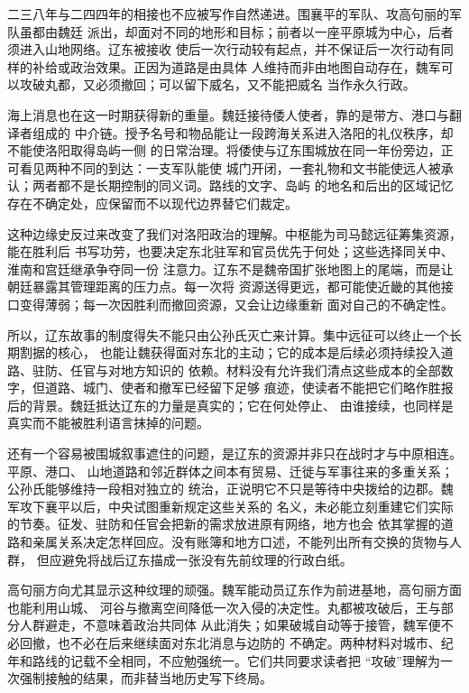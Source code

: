 二三八年与二四四年的相接也不应被写作自然递进。围襄平的军队、攻高句丽的军队虽都由魏廷
派出，却面对不同的地形和目标；前者以一座平原城为中心，后者须进入山地网络。辽东被接收
使后一次行动较有起点，并不保证后一次行动有同样的补给或政治效果。正因为道路是由具体
人维持而非由地图自动存在，魏军可以攻破丸都，又必须撤回；可以留下威名，又不能把威名
当作永久行政。

海上消息也在这一时期获得新的重量。魏廷接待倭人使者，靠的是带方、港口与翻译者组成的
中介链。授予名号和物品能让一段跨海关系进入洛阳的礼仪秩序，却不能使洛阳取得岛屿一侧
的日常治理。将倭使与辽东围城放在同一年份旁边，正可看见两种不同的到达：一支军队能使
城门开闭，一套礼物和文书能使远人被承认；两者都不是长期控制的同义词。路线的文字、岛屿
的地名和后出的区域记忆存在不确定处，应保留而不以现代边界替它们裁定。

这种边缘史反过来改变了我们对洛阳政治的理解。中枢能为司马懿远征筹集资源，能在胜利后
书写功劳，也要决定东北驻军和官员优先于何处；这些选择同关中、淮南和宫廷继承争夺同一份
注意力。辽东不是魏帝国扩张地图上的尾端，而是让朝廷暴露其管理距离的压力点。每一次将
资源送得更远，都可能使近畿的其他接口变得薄弱；每一次因胜利而撤回资源，又会让边缘重新
面对自己的不确定性。

所以，辽东故事的制度得失不能只由公孙氏灭亡来计算。集中远征可以终止一个长期割据的核心，
也能让魏获得面对东北的主动；它的成本是后续必须持续投入道路、驻防、任官与对地方知识的
依赖。材料没有允许我们清点这些成本的全部数字，但道路、城门、使者和撤军已经留下足够
痕迹，使读者不能把它们略作胜报后的背景。魏廷抵达辽东的力量是真实的；它在何处停止、
由谁接续，也同样是真实而不能被胜利语言抹掉的问题。

还有一个容易被围城叙事遮住的问题，是辽东的资源并非只在战时才与中原相连。平原、港口、
山地道路和邻近群体之间本有贸易、迁徙与军事往来的多重关系；公孙氏能够维持一段相对独立的
统治，正说明它不只是等待中央拨给的边郡。魏军攻下襄平以后，中央试图重新规定这些关系的
名义，未必能立刻重建它们实际的节奏。征发、驻防和任官会把新的需求放进原有网络，地方也会
依其掌握的道路和亲属关系决定怎样回应。没有账簿和地方口述，不能列出所有交换的货物与人群，
但应避免将战后辽东描成一张没有先前纹理的行政白纸。

高句丽方向尤其显示这种纹理的顽强。魏军能动员辽东作为前进基地，高句丽方面也能利用山城、
河谷与撤离空间降低一次入侵的决定性。丸都被攻破后，王与部分人群避走，不意味着政治共同体
从此消失；如果破城自动等于接管，魏军便不必回撤，也不必在后来继续面对东北消息与边防的
不确定。两种材料对城市、纪年和路线的记载不全相同，不应勉强统一。它们共同要求读者把
“攻破”理解为一次强制接触的结果，而非替当地历史写下终局。

